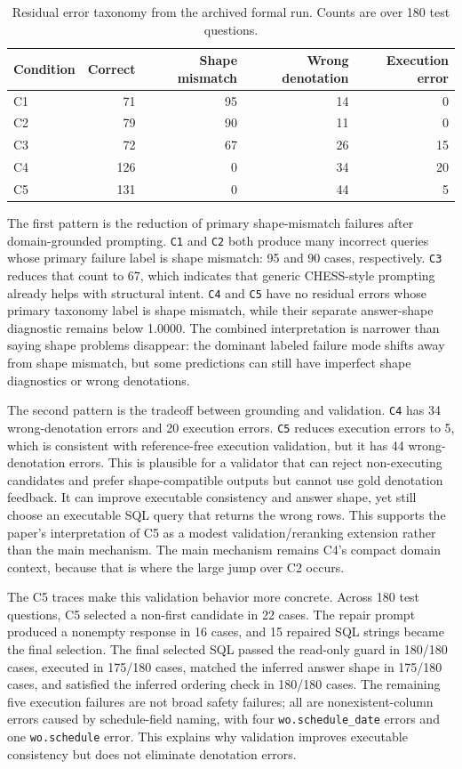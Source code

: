 \documentclass{ieeeaccess}
\begin{document}
\begin{table}[t]
\caption{Residual error taxonomy from the archived formal run. Counts are over 180 test questions.}
\centering
\small
\begin{tabular*}{\textwidth}{@{\extracolsep{\fill}}lrrrr}
\toprule
Condition & Correct & Shape mismatch & Wrong denotation & Execution error \\
\midrule
C1 & 71 & 95 & 14 & 0 \\
C2 & 79 & 90 & 11 & 0 \\
C3 & 72 & 67 & 26 & 15 \\
C4 & 126 & 0 & 34 & 20 \\
C5 & 131 & 0 & 44 & 5 \\
\bottomrule
\end{tabular*}
\end{table}

The first pattern is the reduction of primary shape-mismatch failures after domain-grounded prompting. \texttt{C1} and \texttt{C2} both produce many incorrect queries whose primary failure label is shape mismatch: 95 and 90 cases, respectively. \texttt{C3} reduces that count to 67, which indicates that generic CHESS-style prompting already helps with structural intent. \texttt{C4} and \texttt{C5} have no residual errors whose primary taxonomy label is shape mismatch, while their separate answer-shape diagnostic remains below 1.0000. The combined interpretation is narrower than saying shape problems disappear: the dominant labeled failure mode shifts away from shape mismatch, but some predictions can still have imperfect shape diagnostics or wrong denotations.

The second pattern is the tradeoff between grounding and validation. \texttt{C4} has 34 wrong-denotation errors and 20 execution errors. \texttt{C5} reduces execution errors to 5, which is consistent with reference-free execution validation, but it has 44 wrong-denotation errors. This is plausible for a validator that can reject non-executing candidates and prefer shape-compatible outputs but cannot use gold denotation feedback. It can improve executable consistency and answer shape, yet still choose an executable SQL query that returns the wrong rows. This supports the paper's interpretation of C5 as a modest validation/reranking extension rather than the main mechanism. The main mechanism remains C4's compact domain context, because that is where the large jump over C2 occurs.

The C5 traces make this validation behavior more concrete. Across 180 test questions, C5 selected a non-first candidate in 22 cases. The repair prompt produced a nonempty response in 16 cases, and 15 repaired SQL strings became the final selection. The final selected SQL passed the read-only guard in 180/180 cases, executed in 175/180 cases, matched the inferred answer shape in 175/180 cases, and satisfied the inferred ordering check in 180/180 cases. The remaining five execution failures are not broad safety failures; all are nonexistent-column errors caused by schedule-field naming, with four \texttt{wo.schedule\_date} errors and one \texttt{wo.schedule} error. This explains why validation improves executable consistency but does not eliminate denotation errors.
\end{document}
